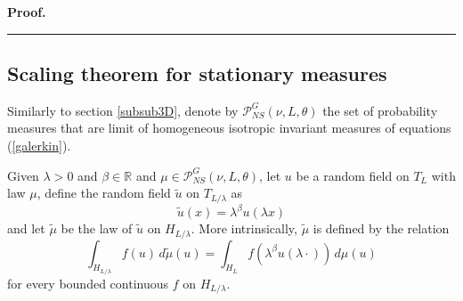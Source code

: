\documentclass[11pt]{preprint}
\newenvironment{proof}[1][Proof]{\textbf{#1.} }{\ \rule{0.5em}{0.5em}}
\begin{document}
\begin{proof}
\end{proof}

\subsection{Scaling theorem for stationary measures}

Similarly to section \ref{subsub3D}, denote by $\mathcal{P}_{NS}^{G}\left(
\nu,L,\theta\right)  $ the set of probability measures that are limit of
homogeneous isotropic invariant measures of equations (\ref{galerkin}).

Given $\lambda>0$ and $\beta\in\mathbb{R}$ and $\mu\in\mathcal{P}_{NS}%
^{G}\left(  \nu,L,\theta\right)  $, let $u$ be a random field on $T_{L}$ with
law $\mu$, define the random field $\widetilde{u}$ on $T_{L/\lambda}$ as
\[
\widetilde{u}(x)=\lambda^{\beta}u(\lambda x)
\]
and let $\widetilde{\mu}$ be the law of $\widetilde{u}$ on $H_{L/\lambda}$.
More intrinsically, $\widetilde{\mu}$ is defined by the relation
\[
\int_{H_{L/\lambda}}f(u)\,d\widetilde{\mu}(u)=\int_{H_{L}}f(\lambda^{\beta
}u\left(  \lambda\cdot\right)  )\,d\mu(u)
\]
for every bounded continuous $f$ on $H_{L/\lambda}$.
\end{document}
